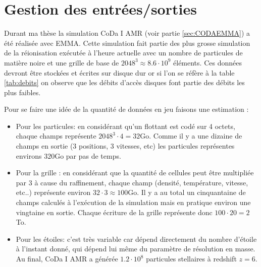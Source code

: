 

\section{Gestion des entrées/sorties}
\label{sec:io}

Durant ma thèse la simulation CoDa I AMR (voir partie \ref{sec:CODAEMMA}) a été réalisée avec EMMA.
Cette simulation fait partie des plus grosse simulation de la réionisation exécutée à l'heure actuelle avec un nombre de particules de matière noire et une grille de base de $2048^3 \approx 8.6\cdot 10^9$ éléments.
Ces données devront être stockées et écrites sur disque dur or si l'on se réfère à la table \ref{tab:debits} on observe que les débits d'accès disques font partie des débits les plus faibles.

Pour se faire une idée de la quantité de données en jeu faisons une estimation : 

\begin{itemize}
\item Pour les particules: en considérant qu'un flottant est codé sur 4 octets, chaque champs représente $2048^3 \cdot 4 = 32$Go.
Comme il y a une dizaine de champs en sortie (3 positions, 3 vitesses, etc) les particules représentes environs $320$Go par pas de temps.

\item Pour la grille : en considérant que la quantité de cellules peut être multipliée par 3 à cause du raffinement, chaque champ (densité, température, vitesse, etc..) représente environ $32 \cdot 3 \approx 100$Go.
Il y a au total un cinquantaine de champs calculés à l'exécution de la simulation mais en pratique environ une vingtaine en sortie.
Chaque écriture de la grille représente donc $100\cdot 20 =2$To.

\item Pour les étoiles: c'est très variable car dépend directement du nombre d'étoile à l'instant donné, qui dépend lui même du paramètre de résolution en masse.
Au final, CoDa I AMR a générée $1.2 \cdot 10^8$ particules stellaires à redshift $z=6$.
\end{itemize}

